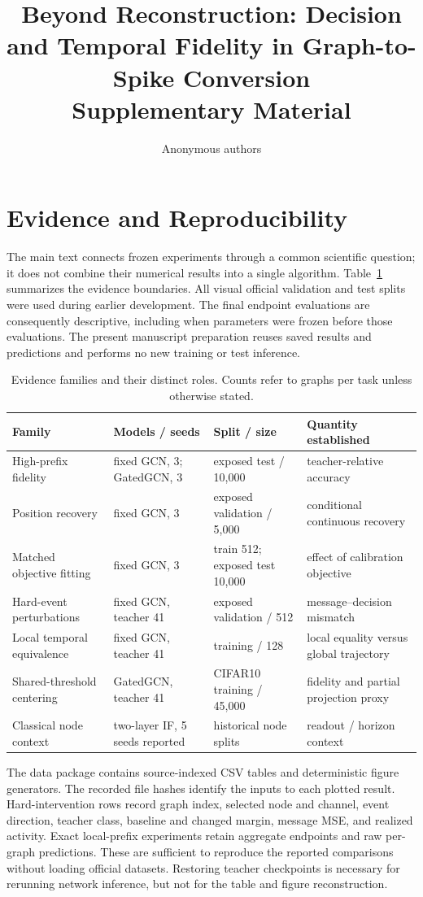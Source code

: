 \documentclass[10pt,twocolumn,letterpaper]{article}
\title{Beyond Reconstruction: Decision and Temporal Fidelity in Graph-to-Spike Conversion\\Supplementary Material}
\author{Anonymous authors}
\begin{document}
\maketitle
\section{Evidence and Reproducibility}
The main text connects frozen experiments through a common scientific question; it does not combine their numerical results into a single algorithm. Table~\ref{tab:scope} summarizes the evidence boundaries. All visual official validation and test splits were used during earlier development. The final endpoint evaluations are consequently descriptive, including when parameters were frozen before those evaluations. The present manuscript preparation reuses saved results and predictions and performs no new training or test inference.

\begin{table}[t]\centering\small
\caption{Evidence families and their distinct roles. Counts refer to graphs per task unless otherwise stated.}
\label{tab:scope}
\setlength{\tabcolsep}{5pt}\begin{tabular}{llll}\toprule
Family & Models / seeds & Split / size & Quantity established\\\midrule
High-prefix fidelity & fixed GCN, 3; GatedGCN, 3 & exposed test / 10,000 & teacher-relative accuracy\\
Position recovery & fixed GCN, 3 & exposed validation / 5,000 & conditional continuous recovery\\
Matched objective fitting & fixed GCN, 3 & train 512; exposed test 10,000 & effect of calibration objective\\
Hard-event perturbations & fixed GCN, teacher 41 & exposed validation / 512 & message--decision mismatch\\
Local temporal equivalence & fixed GCN, teacher 41 & training / 128 & local equality versus global trajectory\\
Shared-threshold centering & GatedGCN, teacher 41 & CIFAR10 training / 45,000 & fidelity and partial projection proxy\\
Classical node context & two-layer IF, 5 seeds reported & historical node splits & readout / horizon context\\\bottomrule
\end{tabular}\end{table}

The data package contains source-indexed CSV tables and deterministic figure generators. The recorded file hashes identify the inputs to each plotted result. Hard-intervention rows record graph index, selected node and channel, event direction, teacher class, baseline and changed margin, message MSE, and realized activity. Exact local-prefix experiments retain aggregate endpoints and raw per-graph predictions. These are sufficient to reproduce the reported comparisons without loading official datasets. Restoring teacher checkpoints is necessary for rerunning network inference, but not for the table and figure reconstruction.
\end{document}
